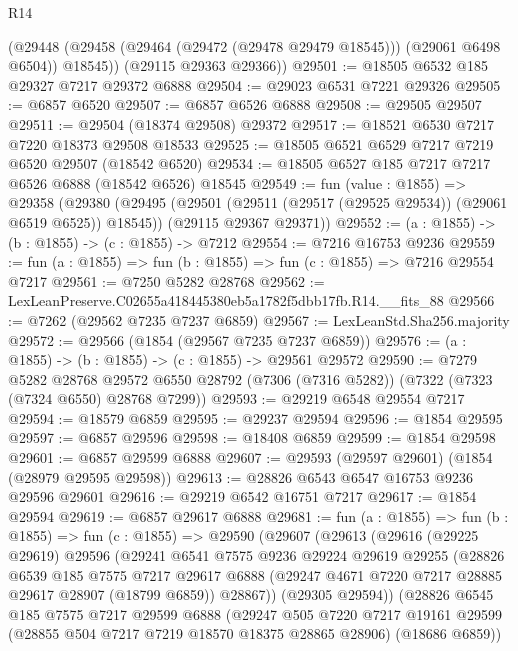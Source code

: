 \begin{lexlean}{R14}
\begin{coremodule}
        (@29448 (@29458 (@29464 (@29472 (@29478 @29479 @18545))) (@29061 @6498 @6504)) @18545))
      (@29115 @29363 @29366))
@29501 := @18505 @6532 @185 @29327 @7217 @29372 @6888
@29504 := @29023 @6531 @7221 @29326
@29505 := @6857 @6520
@29507 := @6857 @6526 @6888
@29508 := @29505 @29507
@29511 := @29504 (@18374 @29508) @29372
@29517 := @18521 @6530 @7217 @7220 @18373 @29508 @18533
@29525 := @18505 @6521 @6529 @7217 @7219 @6520 @29507 (@18542 @6520)
@29534 := @18505 @6527 @185 @7217 @7217 @6526 @6888 (@18542 @6526) @18545
@29549 := fun (value : @1855) =>
  @29358
    (@29380
      (@29495 (@29501 (@29511 (@29517 (@29525 @29534)) (@29061 @6519 @6525)) @18545))
      (@29115 @29367 @29371))
@29552 := (a : @1855) -> (b : @1855) -> (c : @1855) -> @7212
@29554 := @7216 @16753 @9236
@29559 := fun (a : @1855) => fun (b : @1855) => fun (c : @1855) => @7216 @29554 @7217
@29561 := @7250 @5282 @28768
@29562 := LexLeanPreserve.C02655a418445380eb5a1782f5dbb17fb.R14.__fits_88
@29566 := @7262 (@29562 @7235 @7237 @6859)
@29567 := LexLeanStd.Sha256.majority
@29572 := @29566 (@1854 (@29567 @7235 @7237 @6859))
@29576 := (a : @1855) -> (b : @1855) -> (c : @1855) -> @29561 @29572
@29590 := @7279
    @5282
    @28768
    @29572
    @6550
    @28792
    (@7306 (@7316 @5282))
    (@7322 (@7323 (@7324 @6550) @28768 @7299))
@29593 := @29219 @6548 @29554 @7217
@29594 := @18579 @6859
@29595 := @29237 @29594
@29596 := @1854 @29595
@29597 := @6857 @29596
@29598 := @18408 @6859
@29599 := @1854 @29598
@29601 := @6857 @29599 @6888
@29607 := @29593 (@29597 @29601) (@1854 (@28979 @29595 @29598))
@29613 := @28826 @6543 @6547 @16753 @9236 @29596 @29601
@29616 := @29219 @6542 @16751 @7217
@29617 := @1854 @29594
@29619 := @6857 @29617 @6888
@29681 := fun (a : @1855) =>
  fun (b : @1855) =>
  fun (c : @1855) =>
  @29590
    (@29607
      (@29613
        (@29616
          (@29225 @29619)
          @29596
          (@29241
            @6541
            @7575
            @9236
            @29224
            @29619
            @29255
            (@28826
              @6539
              @185
              @7575
              @7217
              @29617
              @6888
              (@29247 @4671 @7220 @7217 @28885 @29617 @28907 (@18799 @6859))
              @28867))
          (@29305 @29594))
        (@28826
          @6545
          @185
          @7575
          @7217
          @29599
          @6888
          (@29247
            @505
            @7220
            @7217
            @19161
            @29599
            (@28855 @504 @7217 @7219 @18570 @18375 @28865 @28906)
            (@18686 @6859))

\end{coremodule}
\end{lexlean}
